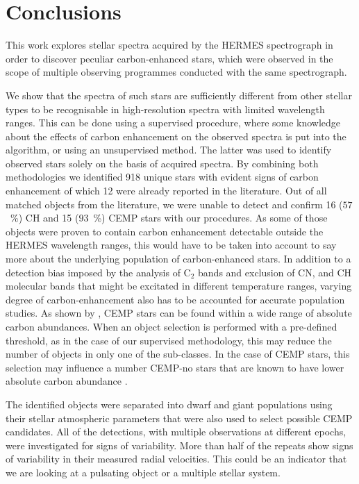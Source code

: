 \section{Conclusions}
\label{sec:summary_cemp}
This work explores stellar spectra acquired by the HERMES spectrograph in order to discover peculiar carbon-enhanced stars, which were observed in the scope of multiple observing programmes conducted with the same spectrograph.

We show that the spectra of such stars are sufficiently different from other stellar types to be recognisable in high-resolution spectra with limited wavelength ranges. This can be done using a supervised procedure, where some knowledge about the effects of carbon enhancement on the observed spectra is put into the algorithm, or using an unsupervised method. The latter was used to identify observed stars solely on the basis of acquired spectra. By combining both methodologies we identified 918 unique stars with evident signs of carbon enhancement of which 12 were already reported in the literature. Out of all matched objects from the literature, we were unable to detect and confirm 16 ($57$~\%) CH and 15 ($93$~\%) CEMP stars with our procedures. As some of those objects were proven to contain carbon enhancement detectable outside the HERMES wavelength ranges, this would have to be taken into account to say more about the underlying population of carbon-enhanced stars. In addition to a detection bias imposed by the analysis of C$_2$ bands and exclusion of CN, and CH molecular bands that might be excitated in different temperature ranges, varying degree of carbon-enhancement also has to be accounted for accurate population studies. As shown by \citet{2016ApJ...833...20Y}, CEMP stars can be found within a wide range of absolute carbon abundances. When an object selection is performed with a pre-defined threshold, as in the case of our supervised methodology, this may reduce the number of objects in only one of the sub-classes. In the case of CEMP stars, this selection may influence a number CEMP-no stars that are known to have lower absolute carbon abundance \cite{2016ApJ...833...20Y}.

The identified objects were separated into dwarf and giant populations using their stellar atmospheric parameters that were also used to select possible CEMP candidates. All of the detections, with multiple observations at different epochs, were investigated for signs of variability. More than half of the repeats show signs of variability in their measured radial velocities. This could be an indicator that we are looking at a pulsating object or a multiple stellar system.


